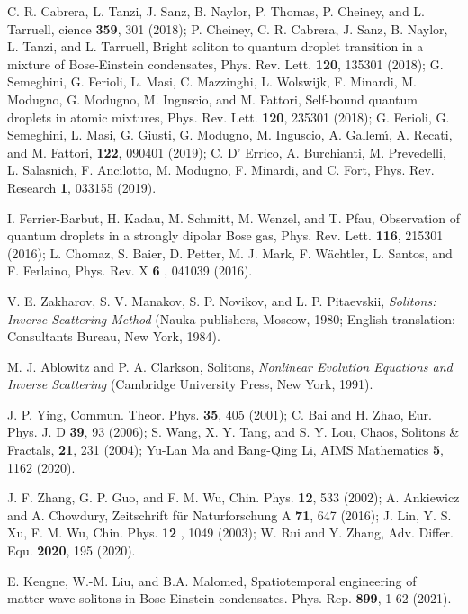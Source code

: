 \documentclass[preprintnumbers]{revtex4}
\begin{document}
\begin{thebibliography}{99}
 C. R. Cabrera, L. Tanzi, J. Sanz, B. Naylor, P. Thomas, P.
Cheiney, and L. Tarruell, cience \textbf{359}, 301 (2018); P. Cheiney, C. R.
Cabrera, J. Sanz, B. Naylor, L. Tanzi, and L. Tarruell, Bright soliton to
quantum droplet transition in a mixture of Bose-Einstein condensates, Phys.
Rev. Lett. \textbf{120}, 135301 (2018); G. Semeghini, G. Ferioli, L. Masi,
C. Mazzinghi, L. Wolswijk, F. Minardi, M. Modugno, G. Modugno, M. Inguscio,
and M. Fattori, Self-bound quantum droplets in atomic mixtures, Phys. Rev.
Lett. \textbf{120}, 235301 (2018); G. Ferioli, G. Semeghini, L. Masi, G.
Giusti, G. Modugno, M. Inguscio, A. Gallem\'{\i}, A. Recati, and M. Fattori,
\textbf{122}, 090401 (2019); C. D' Errico, A. Burchianti, M. Prevedelli, L.
Salasnich, F. Ancilotto, M. Modugno, F. Minardi, and C. Fort, Phys. Rev.
Research \textbf{1}, 033155 (2019).

 I. Ferrier-Barbut, H. Kadau, M. Schmitt, M. Wenzel, and T.
Pfau, Observation of quantum droplets in a strongly dipolar Bose gas, Phys.
Rev. Lett. \textbf{116}, 215301 (2016); L. Chomaz, S. Baier, D. Petter, M.
J. Mark, F. W\"{a}chtler, L. Santos, and F. Ferlaino, Phys. Rev. X \textbf{6}%
, 041039 (2016).

 V. E. Zakharov, S. V. Manakov, S. P. Novikov, and L. P.
Pitaevskii, \textit{Solitons: Inverse Scattering Method} (Nauka publishers,
Moscow, 1980; English translation: Consultants Bureau, New York, 1984).

 M. J. Ablowitz and P. A. Clarkson, Solitons, \textit{Nonlinear
Evolution Equations and Inverse Scattering} (Cambridge University Press, New
York, 1991).

 J. P. Ying, Commun. Theor. Phys. \textbf{35}, 405 (2001); C.
Bai and H. Zhao, Eur. Phys. J. D \textbf{39}, 93 (2006); S. Wang, X. Y.
Tang, and S. Y. Lou, Chaos, Solitons \& Fractals, \textbf{21}, 231 (2004);
Yu-Lan Ma and Bang-Qing Li, AIMS Mathematics \textbf{5}, 1162 (2020).

 J. F. Zhang, G. P. Guo, and F. M. Wu, Chin. Phys. \textbf{12},
533 (2002); A. Ankiewicz and A. Chowdury, Zeitschrift f\"{u}r Naturforschung
A \textbf{71}, 647 (2016); J. Lin, Y. S. Xu, F. M. Wu, Chin. Phys. \textbf{12%
}, 1049 (2003); W. Rui and Y. Zhang, Adv. Differ. Equ. \textbf{2020}, 195
(2020).

 E. Kengne, W.-M. Liu, and B.A. Malomed, Spatiotemporal
engineering of matter-wave solitons in Bose-Einstein condensates. Phys. Rep.
\textbf{899}, 1-62 (2021).


\end{thebibliography}
\end{document}
